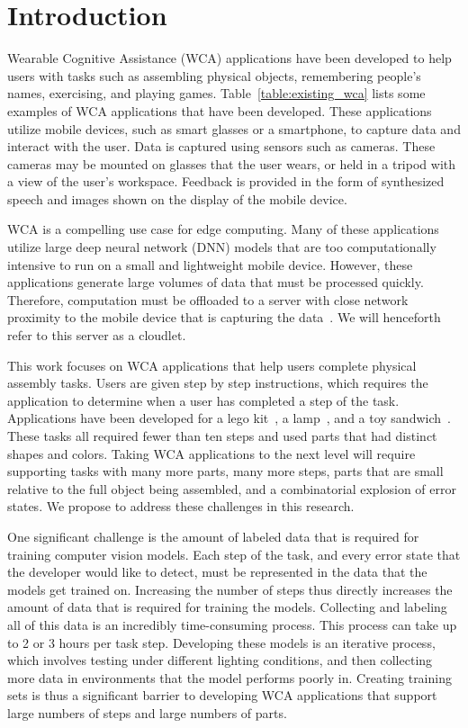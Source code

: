 \chapter{Introduction}\label{chap:intro}

Wearable Cognitive Assistance (WCA) applications have been developed to help
users with tasks such as assembling physical objects, remembering people's
names, exercising, and playing games. Table~\ref{table:existing_wca} lists some
examples of WCA applications that have been developed. These applications
utilize mobile devices, such as smart glasses or a smartphone, to capture data
and interact with the user. Data is captured using sensors such as cameras.
These cameras may be mounted on glasses that the user wears, or held in a tripod
with a view of the user's workspace.
Feedback is provided in the form of synthesized speech and images shown on the
display of the mobile device.

WCA is a compelling use case for edge computing. Many of these applications
utilize large deep neural network (DNN) models that are too computationally
intensive to run on a small and lightweight mobile device. However, these
applications generate large volumes of data that must be processed quickly.
Therefore, computation must be offloaded to a server with close network
proximity to the mobile device that is capturing the data~\cite{satya14}. We
will henceforth refer to this server as a cloudlet.

This work focuses on WCA applications that help users complete physical
assembly tasks.
Users are given step by step instructions, which requires the application to
determine when a user has completed a step of the task. Applications have been
developed for a lego kit~\cite{lego}, a lamp~\cite{lamp}, and a toy
sandwich~\cite{sandwich}. These tasks all required fewer than ten steps and
used parts that had distinct shapes and colors.
Taking WCA applications to the next level will require supporting tasks with
many more parts, many more steps, parts that are small relative to the full
object being assembled, and a combinatorial explosion of error states.
We propose to address these challenges in this research.

One significant challenge is the amount of labeled data that is required for
training computer vision models. Each
step of the task, and every error state that the developer would like to detect,
must be represented in the data that the models get trained on.
Increasing the number of steps thus directly increases the amount of data that
is required for training the models.
Collecting and labeling all of this data is an incredibly time-consuming
process.
This process can take up to 2 or 3 hours per task step.
Developing these models is an iterative process, which involves testing under
different lighting conditions, and then collecting more data in environments
that the model performs poorly in.
Creating training sets is thus a significant barrier to developing WCA
applications that support large numbers of steps and large numbers of parts.


